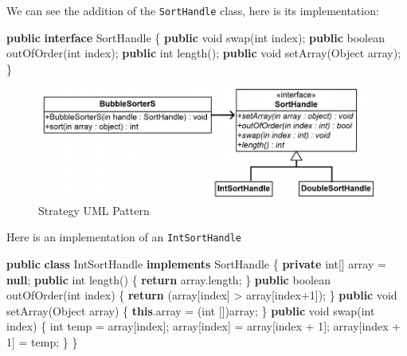 \documentclass[]{article}
\newenvironment{Shaded}{}{}
\newcommand{\BuiltInTok}[1]{#1}
\newcommand{\DataTypeTok}[1]{\textcolor[rgb]{0.56,0.13,0.00}{#1}}
\newcommand{\DecValTok}[1]{\textcolor[rgb]{0.25,0.63,0.44}{#1}}
\newcommand{\FunctionTok}[1]{\textcolor[rgb]{0.02,0.16,0.49}{#1}}
\newcommand{\KeywordTok}[1]{\textcolor[rgb]{0.00,0.44,0.13}{\textbf{#1}}}
\newcommand{\NormalTok}[1]{#1}
\begin{document}
We can see the addition of the \texttt{SortHandle} class, here is its
implementation:

\begin{Shaded}
\begin{Highlighting}[]
\KeywordTok{public} \KeywordTok{interface}\NormalTok{ SortHandle \{}
    \KeywordTok{public} \DataTypeTok{void} \FunctionTok{swap}\NormalTok{(}\DataTypeTok{int}\NormalTok{ index);}
    \KeywordTok{public} \DataTypeTok{boolean} \FunctionTok{outOfOrder}\NormalTok{(}\DataTypeTok{int}\NormalTok{ index);}
    \KeywordTok{public} \DataTypeTok{int} \FunctionTok{length}\NormalTok{();}
    \KeywordTok{public} \DataTypeTok{void} \FunctionTok{setArray}\NormalTok{(}\BuiltInTok{Object}\NormalTok{ array);}
\NormalTok{\}}
\end{Highlighting}
\end{Shaded}

\begin{figure}
\centering
\includegraphics{images/strategyuml.png}
\caption{Strategy UML Pattern}
\end{figure}

Here is an implementation of an \texttt{IntSortHandle}

\begin{Shaded}
\begin{Highlighting}[]
\KeywordTok{public} \KeywordTok{class}\NormalTok{ IntSortHandle }\KeywordTok{implements}\NormalTok{ SortHandle \{}
    \KeywordTok{private} \DataTypeTok{int}\NormalTok{[] array = }\KeywordTok{null}\NormalTok{;}
    \KeywordTok{public} \DataTypeTok{int} \FunctionTok{length}\NormalTok{() \{}
        \KeywordTok{return}\NormalTok{ array.}\FunctionTok{length}\NormalTok{;}
\NormalTok{    \}}
    \KeywordTok{public} \DataTypeTok{boolean} \FunctionTok{outOfOrder}\NormalTok{(}\DataTypeTok{int}\NormalTok{ index) \{}
        \KeywordTok{return}\NormalTok{ (array[index] > array[index+}\DecValTok{1}\NormalTok{]);}
\NormalTok{    \}}
    \KeywordTok{public} \DataTypeTok{void} \FunctionTok{setArray}\NormalTok{(}\BuiltInTok{Object}\NormalTok{ array) \{}
        \KeywordTok{this}\NormalTok{.}\FunctionTok{array}\NormalTok{ = (}\DataTypeTok{int}\NormalTok{ [])array;}
\NormalTok{    \}}
    \KeywordTok{public} \DataTypeTok{void} \FunctionTok{swap}\NormalTok{(}\DataTypeTok{int}\NormalTok{ index) \{}
        \DataTypeTok{int}\NormalTok{ temp = array[index];}
\NormalTok{        array[index] = array[index + }\DecValTok{1}\NormalTok{];}
\NormalTok{        array[index + }\DecValTok{1}\NormalTok{] = temp;}
\NormalTok{    \}}
\NormalTok{\}}
\end{Highlighting}
\end{Shaded}
\end{document}
